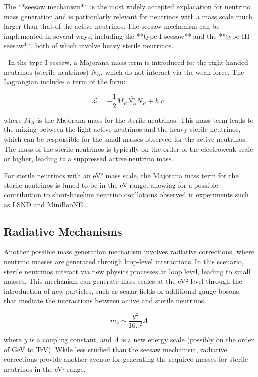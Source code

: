 \documentclass[a4paper,12pt,numbered]{article}
\begin{document}
The **seesaw mechanism** is the most widely accepted explanation for neutrino mass generation and is particularly relevant for neutrinos with a mass scale much larger than that of the active neutrinos. The seesaw mechanism can be implemented in several ways, including the **type I seesaw** and the **type III seesaw**, both of which involve heavy sterile neutrinos.

- In the type I seesaw, a Majorana mass term is introduced for the right-handed neutrinos (sterile neutrinos) \( N_R \), which do not interact via the weak force. The Lagrangian includes a term of the form:

\[
\mathcal{L} = - \frac{1}{2} M_R \overline{N_R^c} N_R + h.c.
\]

where \( M_R \) is the Majorana mass for the sterile neutrinos. This mass term leads to the mixing between the light active neutrinos and the heavy sterile neutrinos, which can be responsible for the small masses observed for the active neutrinos. The mass of the sterile neutrinos is typically on the order of the electroweak scale or higher, leading to a suppressed active neutrino mass. 

For sterile neutrinos with an eV² mass scale, the Majorana mass term for the sterile neutrinos is tuned to be in the eV range, allowing for a possible contribution to short-baseline neutrino oscillations observed in experiments such as LSND and MiniBooNE \cite{LSND, MiniBooNE}.

\subsection{Radiative Mechanisms}

Another possible mass generation mechanism involves radiative corrections, where neutrino masses are generated through loop-level interactions. In this scenario, sterile neutrinos interact via new physics processes at loop level, leading to small masses. This mechanism can generate mass scales at the eV² level through the introduction of new particles, such as scalar fields or additional gauge bosons, that mediate the interactions between active and sterile neutrinos.

\[
m_\nu \sim \frac{y^2}{16\pi^2} \Lambda
\]

where \( y \) is a coupling constant, and \( \Lambda \) is a new energy scale (possibly on the order of GeV to TeV). While less studied than the seesaw mechanism, radiative corrections provide another avenue for generating the required masses for sterile neutrinos in the eV² range.
\end{document}
